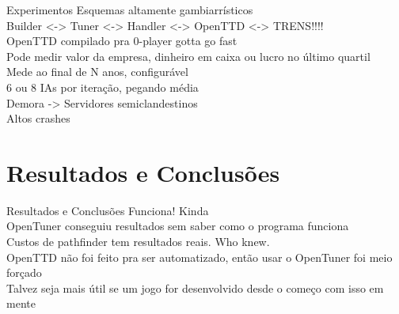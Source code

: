 \documentclass[10pt]{beamer}
\begin{document}
\begin{frame}{Experimentos}
	Esquemas altamente gambiarrísticos \pause\\
	Builder <-> Tuner <-> Handler <-> OpenTTD <-> TRENS!!!!\pause\\
	OpenTTD compilado pra 0-player gotta go fast\pause\\
	Pode medir valor da empresa, dinheiro em caixa ou lucro no último quartil\pause\\
	Mede ao final de N anos, configurável\pause\\
	6 ou 8 IAs por iteração, pegando média\pause\\
	Demora \pause -> Servidores semiclandestinos\pause\\
	Altos crashes
\end{frame}

\section{Resultados e Conclusões}

\begin{frame}{Resultados e Conclusões}
	Funciona! \pause Kinda\pause\\
	OpenTuner conseguiu resultados sem saber como o programa funciona\pause \\
	Custos de pathfinder tem resultados reais. Who knew.\pause\\
	OpenTTD não foi feito pra ser automatizado, então usar o OpenTuner foi meio forçado\pause\\
	Talvez seja mais útil se um jogo for desenvolvido desde o começo com isso em mente
\end{frame}
\end{document}
